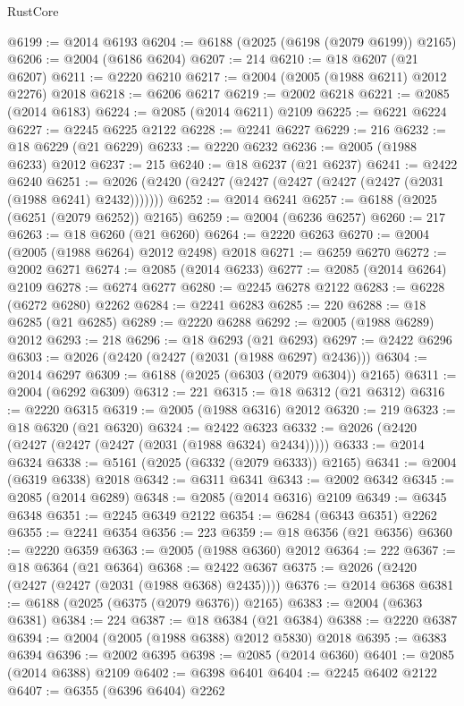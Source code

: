 \begin{lexlean}{RustCore}
\begin{coremodule}
@6199 := @2014 @6193
@6204 := @6188 (@2025 (@6198 (@2079 @6199)) @2165)
@6206 := @2004 (@6186 @6204)
@6207 := 214
@6210 := @18 @6207 (@21 @6207)
@6211 := @2220 @6210
@6217 := @2004 (@2005 (@1988 @6211) @2012 @2276) @2018
@6218 := @6206 @6217
@6219 := @2002 @6218
@6221 := @2085 (@2014 @6183)
@6224 := @2085 (@2014 @6211) @2109
@6225 := @6221 @6224
@6227 := @2245 @6225 @2122
@6228 := @2241 @6227
@6229 := 216
@6232 := @18 @6229 (@21 @6229)
@6233 := @2220 @6232
@6236 := @2005 (@1988 @6233) @2012
@6237 := 215
@6240 := @18 @6237 (@21 @6237)
@6241 := @2422 @6240
@6251 := @2026 (@2420 (@2427 (@2427 (@2427 (@2427 (@2427 (@2031 (@1988 @6241) @2432)))))))
@6252 := @2014 @6241
@6257 := @6188 (@2025 (@6251 (@2079 @6252)) @2165)
@6259 := @2004 (@6236 @6257)
@6260 := 217
@6263 := @18 @6260 (@21 @6260)
@6264 := @2220 @6263
@6270 := @2004 (@2005 (@1988 @6264) @2012 @2498) @2018
@6271 := @6259 @6270
@6272 := @2002 @6271
@6274 := @2085 (@2014 @6233)
@6277 := @2085 (@2014 @6264) @2109
@6278 := @6274 @6277
@6280 := @2245 @6278 @2122
@6283 := @6228 (@6272 @6280) @2262
@6284 := @2241 @6283
@6285 := 220
@6288 := @18 @6285 (@21 @6285)
@6289 := @2220 @6288
@6292 := @2005 (@1988 @6289) @2012
@6293 := 218
@6296 := @18 @6293 (@21 @6293)
@6297 := @2422 @6296
@6303 := @2026 (@2420 (@2427 (@2031 (@1988 @6297) @2436)))
@6304 := @2014 @6297
@6309 := @6188 (@2025 (@6303 (@2079 @6304)) @2165)
@6311 := @2004 (@6292 @6309)
@6312 := 221
@6315 := @18 @6312 (@21 @6312)
@6316 := @2220 @6315
@6319 := @2005 (@1988 @6316) @2012
@6320 := 219
@6323 := @18 @6320 (@21 @6320)
@6324 := @2422 @6323
@6332 := @2026 (@2420 (@2427 (@2427 (@2427 (@2031 (@1988 @6324) @2434)))))
@6333 := @2014 @6324
@6338 := @5161 (@2025 (@6332 (@2079 @6333)) @2165)
@6341 := @2004 (@6319 @6338) @2018
@6342 := @6311 @6341
@6343 := @2002 @6342
@6345 := @2085 (@2014 @6289)
@6348 := @2085 (@2014 @6316) @2109
@6349 := @6345 @6348
@6351 := @2245 @6349 @2122
@6354 := @6284 (@6343 @6351) @2262
@6355 := @2241 @6354
@6356 := 223
@6359 := @18 @6356 (@21 @6356)
@6360 := @2220 @6359
@6363 := @2005 (@1988 @6360) @2012
@6364 := 222
@6367 := @18 @6364 (@21 @6364)
@6368 := @2422 @6367
@6375 := @2026 (@2420 (@2427 (@2427 (@2031 (@1988 @6368) @2435))))
@6376 := @2014 @6368
@6381 := @6188 (@2025 (@6375 (@2079 @6376)) @2165)
@6383 := @2004 (@6363 @6381)
@6384 := 224
@6387 := @18 @6384 (@21 @6384)
@6388 := @2220 @6387
@6394 := @2004 (@2005 (@1988 @6388) @2012 @5830) @2018
@6395 := @6383 @6394
@6396 := @2002 @6395
@6398 := @2085 (@2014 @6360)
@6401 := @2085 (@2014 @6388) @2109
@6402 := @6398 @6401
@6404 := @2245 @6402 @2122
@6407 := @6355 (@6396 @6404) @2262

\end{coremodule}
\end{lexlean}
